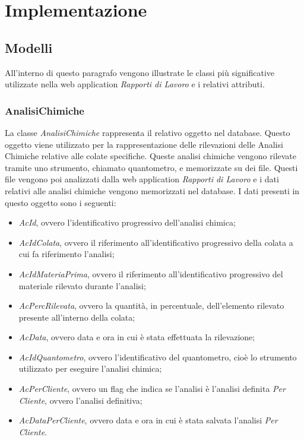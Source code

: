 \chapter{Implementazione}
  \label{chapter_implementazione}
  \section{Modelli}
  All'interno di questo paragrafo vengono illustrate le classi più significative utilizzate nella web application
  \textit{Rapporti di Lavoro} e i relativi attributi.

  \subsection{AnalisiChimiche}
  La classe \textit{AnalisiChimiche} rappresenta il relativo oggetto nel database. Questo oggetto viene utilizzato per la
  rappresentazione delle rilevazioni delle Analisi Chimiche relative alle colate specifiche. Queste analisi chimiche vengono
  rilevate tramite uno strumento, chiamato quantometro, e memorizzate su dei file. Questi file vengono poi analizzati dalla
  web application \textit{Rapporti di Lavoro} e i dati relativi alle analisi chimiche vengono memorizzati nel database. I dati
  presenti in questo oggetto sono i seguenti:
  \begin{itemize}
    \item \textit{AcId}, ovvero l'identificativo progressivo dell'analisi chimica;
    \item \textit{AcIdColata}, ovvero il riferimento all'identificativo progressivo della colata a cui fa riferimento
    l'analisi;
    \item \textit{AcIdMateriaPrima}, ovvero il riferimento all'identificativo progressivo del materiale rilevato durante
    l'analisi;
    \item \textit{AcPercRilevata}, ovvero la quantità, in percentuale, dell'elemento rilevato presente all'interno della
    colata;
    \item \textit{AcData}, ovvero data e ora in cui è stata effettuata la rilevazione;
    \item \textit{AcIdQuantometro}, ovvero l'identificativo del quantometro, cioè lo strumento utilizzato per eseguire
    l'analisi chimica;
    \item \textit{AcPerCliente}, ovvero un flag che indica se l'analisi è l'analisi definita \textit{Per Cliente},
    ovvero l'analisi definitiva;
    \item \textit{AcDataPerCliente}, ovvero data e ora in cui è stata salvata l'analisi \textit{Per Cliente}.
  \end{itemize}

